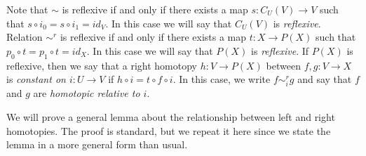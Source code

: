 \documentclass{amsart}
\theoremstyle{definition}
\newcommand{\cyli}{i}
\begin{document}
Note that $\sim$ is reflexive if and only if there exists a map $s : C_U(V) \to V$ such that $s \circ \cyli_0 = s \circ \cyli_1 = id_V$.
In this case we will say that $C_U(V)$ is \emph{reflexive}.
Relation $\sim^r$ is reflexive if and only if there exists a map $t : X \to P(X)$ such that $p_0 \circ t = p_1 \circ t = id_X$.
In this case we will say that $P(X)$ is \emph{reflexive}.
If $P(X)$ is reflexive, then we say that a right homotopy $h : V \to P(X)$ between $f,g : V \to X$
is \emph{constant on $i : U \to V$} if $h \circ i = t \circ f \circ i$.
In this case, we write $f \sim^r_i g$ and say that $f$ and $g$ are \emph{homotopic relative to $i$}.

We will prove a general lemma about the relationship between left and right homotopies.
The proof is standard, but we repeat it here since we state the lemma in a more general form than usual.
\end{document}
